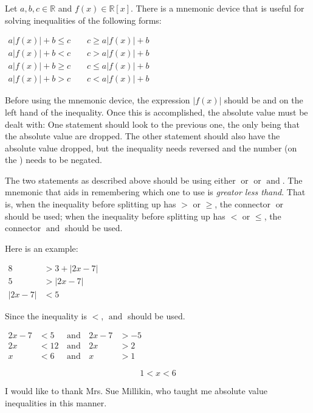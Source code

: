 \documentclass[12pt]{article}
\begin{document}
Let $a,b,c \in \mathbb{R}$ and $f(x) \in \mathbb{R}[x]$.  There is a mnemonic device that is useful for solving inequalities of the following forms:

\begin{center}
$\begin{array}{ccc}
a|f(x)|+b \le c & \,\, & c \ge a|f(x)|+b \\
a|f(x)|+b < c & \,\, & c > a|f(x)|+b \\
a|f(x)|+b \ge c & \,\, & c \le a|f(x)|+b \\
a|f(x)|+b > c & \,\, & c < a|f(x)|+b \end{array}$
\end{center}

Before using the mnemonic device, the expression $|f(x)|$ should be  and on the left hand  of the inequality.  Once this is accomplished, the absolute value must be dealt with:  One statement should look  to the previous one, the only  being that the absolute value  are dropped.  The other statement should also have the absolute value  dropped, but the inequality needs reversed and the number (on the ) needs to be negated.

The two statements as described above should be  using either $\operatorname{or}$ or $\operatorname{and}$.  The mnemonic that aids in remembering which one to use is {\sl greator less thand\/}.  That is, when the inequality before splitting up has $>$ or $\ge$, the connector $\operatorname{or}$ should be used; when the inequality before splitting up has $<$ or $\le$, the connector $\operatorname{and}$ should be used.

Here is an example:

\begin{center}
$\begin{array}{rl}
8 & > 3+|2x-7| \\
5 & > |2x-7| \\
|2x-7| & < 5 \end{array}$
\end{center}

Since the inequality is $<$, $\operatorname{and}$ should be used.

\begin{center}
$\begin{array}{rlcrl}
2x-7 & < 5 & \, \operatorname{and} \, & 2x-7 & > -5 \\
2x & < 12 & \, \operatorname{and} \, & 2x & > 2 \\
x & < 6 & \, \operatorname{and} \, & x & > 1 \end{array}$
\end{center}

$$1<x<6$$

I would like to thank Mrs. Sue Millikin, who taught me absolute value inequalities in this manner.
\end{document}
